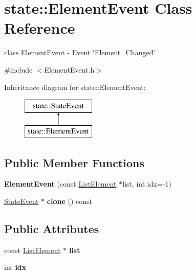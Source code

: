 \hypertarget{classstate_1_1_element_event}{}\section{state\+:\+:Element\+Event Class Reference}
\label{classstate_1_1_element_event}


class \hyperlink{classstate_1_1_element_event}{Element\+Event} -\/ Event \char`\"{}\+Element\+\_\+\+Changed\char`\"{}  




{\ttfamily \#include $<$Element\+Event.\+h$>$}

Inheritance diagram for state\+:\+:Element\+Event\+:\begin{figure}[H]
\begin{center}
\leavevmode
\includegraphics[height=2.000000cm]{classstate_1_1_element_event}
\end{center}
\end{figure}
\subsection*{Public Member Functions}
\begin{DoxyCompactItemize}
\item 
\mbox{\label{classstate_1_1_element_event_a202d5ac87bb4d4622c980322b9171abb}} 
{\bfseries Element\+Event} (const \hyperlink{classstate_1_1_list_element}{List\+Element} $\ast$list, int idx=-\/1)
\item 
\mbox{\label{classstate_1_1_element_event_a41749106ecf73340ead82a6bd867d485}} 
\hyperlink{classstate_1_1_state_event}{State\+Event} $\ast$ {\bfseries clone} () const
\end{DoxyCompactItemize}
\subsection*{Public Attributes}
\begin{DoxyCompactItemize}
\item 
\mbox{\label{classstate_1_1_element_event_a616b97e30980909d9e0ff896672c50f1}} 
const \hyperlink{classstate_1_1_list_element}{List\+Element} $\ast$ {\bfseries list}
\item 
\mbox{\label{classstate_1_1_element_event_a5df40bbf28979ba9e435a4f52a05878e}} 
int {\bfseries idx}
\end{DoxyCompactItemize}


